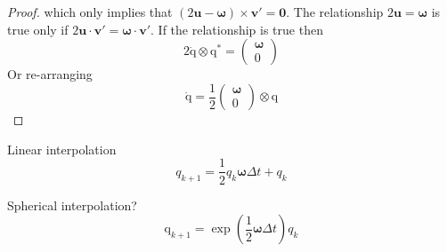 \documentclass{amsart}
\theoremstyle{definition}
\theoremstyle{remark}
\numberwithin{equation}{section}
\begin{document}
\begin{proof}
  which only implies that $(2\mathbf{u}-\boldsymbol\omega)\times\mathbf{v}' = \mathbf{0}$.
  The relationship $2\mathbf{u}=\boldsymbol\omega$ is true only if $2\mathbf{u}\cdot\mathbf{v}'=\boldsymbol\omega\cdot\mathbf{v}'$.
  If the relationship is true then
  \begin{equation}
    2\mathrm{\dot{q}}\otimes\mathrm{q^*} =
    \begin{pmatrix}
      \boldsymbol\omega \\
      0
    \end{pmatrix}
  \end{equation}
  Or re-arranging
  \begin{equation}
    \mathrm{\dot{q}} = \frac{1}{2}
    \begin{pmatrix}
      \boldsymbol\omega \\
      0
    \end{pmatrix}
    \otimes \mathrm{q}
  \end{equation}
\end{proof}

Linear interpolation
\begin{equation}
  q_{k+1} = \frac{1}{2}q_k\boldsymbol\omega\Delta t + q_k 
\end{equation}

Spherical interpolation?
\begin{equation}
  \mathrm{q}_{k+1} = \exp\left(\frac{1}{2} \boldsymbol\omega\Delta t\right)q_k
\end{equation}
\end{document}
